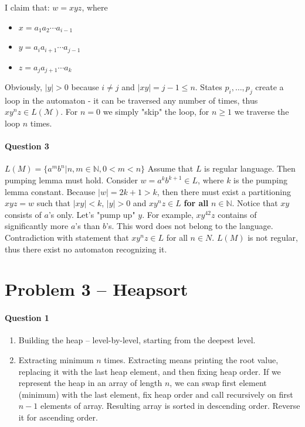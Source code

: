 I claim that: $w = xyz$, where 
\begin{itemize}
    \item $x = a_1a_2\cdots a_{i-1}$
    \item $y = a_ia_{i+1}\cdots a_{j-1}$
    \item $z = a_ja_{j+1}\cdots a_k$
\end{itemize}
Obviously, $|y| > 0$ because $i\neq j$ and $|xy| = j - 1 \leq n$.
States $p_i, \dots, p_j$ create a loop in the automaton - it can be traversed any number of times, thus $xy^nz \in L(\mathcal{M})$.
For $n=0$ we simply "skip" the loop, for $n\geq 1$ we traverse the loop $n$ times.


\paragraph{Question 3}
$L(M) = \{ a^m b^n | n,m \in \mathbb{N}, 0<m<n \}$
Assume that $L$ is regular language.
Then pumping lemma must hold.
Consider $w = a^k b^{k+1} \in L $, where $k$ is the pumping lemma constant.
Because $|w| = 2k + 1 > k$, then there must exist a partitioning
$xyz = w$ such that $|xy| < k$, $|y|>0$ and $xy^nz \in L$ \textbf{for all} $n\in\mathbb{N}$.
Notice that $xy$ consists of $a$'s only.
Let's "pump up" $y$.
For example, $xy^{42}z$ contains of significantly more $a$'s than $b$'s.
This word does not belong to the language.
Contradiction with statement that $x y^n z \in L$ for all $n\in N$.
$L(M)$ is not regular, thus there exist no automaton recognizing it.


\section{Problem 3 – Heapsort}

\paragraph{Question 1}
\begin{enumerate}
    \item Building the heap – level-by-level, starting from the deepest level.
    \item Extracting minimum $n$ times. Extracting means printing the root value, replacing it with the last heap element, and then fixing heap order. 
    If we represent the heap in an array of length $n$, we can swap first element (minimum) with the last element, fix heap order and call recursively on first $n-1$ elements of array.
    Resulting array is sorted in descending order.
    Reverse it for ascending order.
\end{enumerate}

